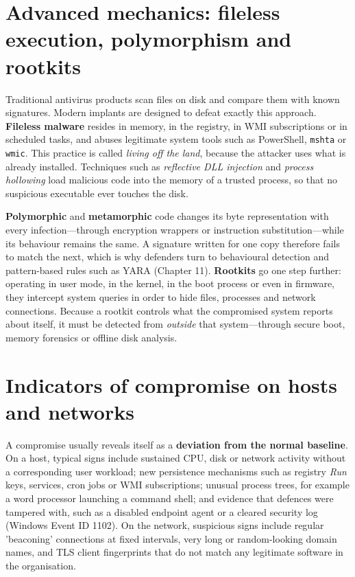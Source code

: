 \section{Advanced mechanics: fileless execution, polymorphism and rootkits}\label{sec:4.2}
Traditional antivirus products scan files on disk and compare them with known signatures. Modern implants are designed to defeat exactly this approach. \textbf{Fileless malware} resides in memory, in the registry, in WMI subscriptions or in scheduled tasks, and abuses legitimate system tools such as PowerShell, \texttt{mshta} or \texttt{wmic}. This practice is called \emph{living off the land}, because the attacker uses what is already installed. Techniques such as \emph{reflective DLL injection} and \emph{process hollowing} load malicious code into the memory of a trusted process, so that no suspicious executable ever touches the disk.

\textbf{Polymorphic} and \textbf{metamorphic} code changes its byte representation with every infection—through encryption wrappers or instruction substitution—while its behaviour remains the same. A signature written for one copy therefore fails to match the next, which is why defenders turn to behavioural detection and pattern-based rules such as YARA (Chapter 11). \textbf{Rootkits} go one step further: operating in user mode, in the kernel, in the boot process or even in firmware, they intercept system queries in order to hide files, processes and network connections. Because a rootkit controls what the compromised system reports about itself, it must be detected from \emph{outside} that system—through secure boot, memory forensics or offline disk analysis.

\section{Indicators of compromise on hosts and networks}\label{sec:4.3}
A compromise usually reveals itself as a \textbf{deviation from the normal baseline}. On a host, typical signs include sustained CPU, disk or network activity without a corresponding user workload; new persistence mechanisms such as registry \emph{Run} keys, services, cron jobs or WMI subscriptions; unusual process trees, for example a word processor launching a command shell; and evidence that defences were tampered with, such as a disabled endpoint agent or a cleared security log (Windows Event ID 1102). On the network, suspicious signs include regular 'beaconing' connections at fixed intervals, very long or random-looking domain names, and TLS client fingerprints that do not match any legitimate software in the organisation.

